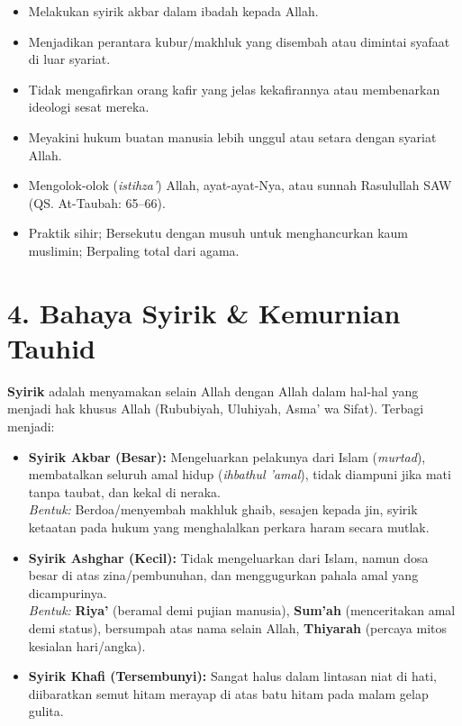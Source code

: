 \documentclass[10pt,a4paper]{article}
\begin{document}
\begin{warningbox}
\begin{itemize}
  \item Melakukan syirik akbar dalam ibadah kepada Allah.
  \item Menjadikan perantara kubur/makhluk yang disembah atau dimintai syafaat di luar syariat.
  \item Tidak mengafirkan orang kafir yang jelas kekafirannya atau membenarkan ideologi sesat mereka.
  \item Meyakini hukum buatan manusia lebih unggul atau setara dengan syariat Allah.
  \item Mengolok-olok (\textit{istihza'}) Allah, ayat-ayat-Nya, atau sunnah Rasulullah SAW (QS. At-Taubah: 65--66).
  \item Praktik sihir; Bersekutu dengan musuh untuk menghancurkan kaum muslimin; Berpaling total dari agama.
\end{itemize}
\end{warningbox}

\section*{\color{ugmblue}\Large 4. Bahaya Syirik \& Kemurnian Tauhid}

\begin{conceptbox}
\textbf{Syirik} adalah menyamakan selain Allah dengan Allah dalam hal-hal yang menjadi hak khusus Allah (Rububiyah, Uluhiyah, Asma' wa Sifat). Terbagi menjadi:
\begin{itemize}
  \item \textbf{Syirik Akbar (Besar):} Mengeluarkan pelakunya dari Islam (\textit{murtad}), membatalkan seluruh amal hidup (\textit{ihbathul 'amal}), tidak diampuni jika mati tanpa taubat, dan kekal di neraka. \\
  \textit{Bentuk:} Berdoa/menyembah makhluk ghaib, sesajen kepada jin, syirik ketaatan pada hukum yang menghalalkan perkara haram secara mutlak.
  \item \textbf{Syirik Ashghar (Kecil):} Tidak mengeluarkan dari Islam, namun dosa besar di atas zina/pembunuhan, dan menggugurkan pahala amal yang dicampurinya. \\
  \textit{Bentuk:} \textbf{Riya'} (beramal demi pujian manusia), \textbf{Sum'ah} (menceritakan amal demi status), bersumpah atas nama selain Allah, \textbf{Thiyarah} (percaya mitos kesialan hari/angka).
  \item \textbf{Syirik Khafi (Tersembunyi):} Sangat halus dalam lintasan niat di hati, diibaratkan semut hitam merayap di atas batu hitam pada malam gelap gulita.
\end{itemize}
\end{conceptbox}
\end{document}
